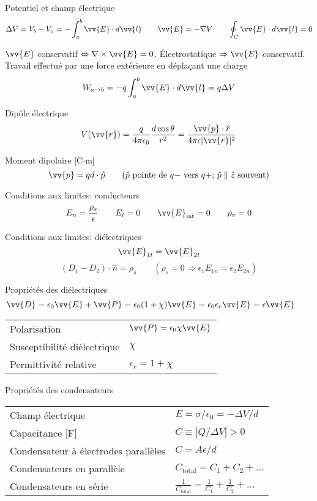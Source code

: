 \documentclass[10pt,landscape]{article}
\newcommand{\extraline}{\vspace{1em}}
\begin{document}
\begin{multicols}{3}
Potentiel et champ électrique
\[ \Delta V = V_b - V_a  = -\int_a^b \vv{E}\cdot d\vv{l} \qquad \vv{E} = -\nabla V 
 \qquad \oint_C \vv{E}\cdot d\vv{l}  = 0 \]

$\vv{E}$ conservatif $\Leftrightarrow \nabla \times \vv{E} = 0$.
Électrostatique $\Rightarrow \vv{E}$ conservatif.\\ 

\extraline
Travail effectué par une force extérieure en déplaçant une charge
\[ W_{a\rightarrow b} = -q\int_{a}^{b} \vv{E}\cdot d\vv{l} = q\Delta V \]

Dipôle électrique
\[ V(\vv{r}) = \frac{q}{4\pi\epsilon_0} \frac{d\cos\theta}{r^2} = \frac{\vv{p}\cdot\hat{r}}{4\pi\epsilon|\vv{r}|^2} \]

Moment dipolaire [C$\cdot$m]
\[ \vv{p} = qd\cdot \hat{p} \qquad \text{($\hat{p}$ pointe de $q-$ vers $q+$;  $\hat{p}\parallel\hat{z}$ souvent)} \]

Conditions aux limites: conducteurs
\[ E_n = \frac{\rho_s}{\epsilon} \qquad E_t = 0 \qquad \vv{E}_\text{int} = 0 \qquad \rho_v = 0 \]

Conditions aux limites: diélectriques
\[ \vv{E}_{1t} =\vv{ E}_{2t}  \]
\[ ({D}_1 - {D}_2) \cdot \hat{n} = \rho_s  \qquad (\rho_s=0 \Rightarrow \epsilon_1 {E}_{1n} = \epsilon_2 {E}_{2n}) \] 

\extraline
Propriétés des diélectriques
\[ \vv{D} = \epsilon_0\vv{E} + \vv{P} = \epsilon_0(1+\chi)\vv{E} = \epsilon_0\epsilon_r\vv{E} = \epsilon\vv{E}
\qquad   \]
\begin{tabular}{@{}ll@{}}
	Polarisation  & $\vv{P} = \epsilon_0\chi\vv{E}$ \\
	Susceptibilité diélectrique  & $\chi$ \\
	Permittivité relative &  $\epsilon_r=1+\chi$
\end{tabular}

\extraline
Propriétés des condensateurs  \\
\extraline
\begin{tabular}{@{}ll@{}}
	Champ électrique & $ E = {\sigma}/{\epsilon_0}  = -{\Delta V}/{d} $ \\
	Capacitance [F] & $C \equiv  | {Q}/{\Delta V} | > 0 $ \\
	Condensateur à électrodes parallèles & $C = {A\epsilon}/{d} $ \\
	Condensateurs en parallèle  & $C_\text{total} = C_1 + C_2 + \dots$ \\
	Condensateurs en série & $\frac{1}{C_\text{total}} = \frac{1}{C_1} + \frac{1}{C_2} + \dots $
\end{tabular}


\end{multicols}
\end{document}
